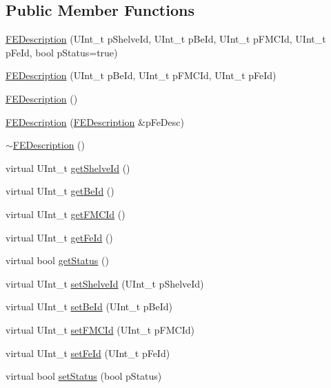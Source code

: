 \subsection*{Public Member Functions}
\begin{DoxyCompactItemize}
\item 
\hyperlink{class_ph2___hw_description_1_1_f_e_description_a8d57b56f9f6f532d16079f0d63dcc8ac}{F\-E\-Description} (U\-Int\-\_\-t p\-Shelve\-Id, U\-Int\-\_\-t p\-Be\-Id, U\-Int\-\_\-t p\-F\-M\-C\-Id, U\-Int\-\_\-t p\-Fe\-Id, bool p\-Status=true)
\item 
\hyperlink{class_ph2___hw_description_1_1_f_e_description_a2619a856a6be6afdbbdee8a2ffecabd8}{F\-E\-Description} (U\-Int\-\_\-t p\-Be\-Id, U\-Int\-\_\-t p\-F\-M\-C\-Id, U\-Int\-\_\-t p\-Fe\-Id)
\item 
\hyperlink{class_ph2___hw_description_1_1_f_e_description_abc5f53987051c0d9746c97e1d993b143}{F\-E\-Description} ()
\item 
\hyperlink{class_ph2___hw_description_1_1_f_e_description_a2c6acc6560237db018675503bd1dc17c}{F\-E\-Description} (\hyperlink{class_ph2___hw_description_1_1_f_e_description}{F\-E\-Description} \&p\-Fe\-Desc)
\item 
\hyperlink{class_ph2___hw_description_1_1_f_e_description_a6f055cd3fade537864dd7c3b34fede39}{$\sim$\-F\-E\-Description} ()
\item 
virtual U\-Int\-\_\-t \hyperlink{class_ph2___hw_description_1_1_f_e_description_a88b8c4fbcd4e0457598fc62a9ee9e738}{get\-Shelve\-Id} ()
\item 
virtual U\-Int\-\_\-t \hyperlink{class_ph2___hw_description_1_1_f_e_description_a490d84e3207965c1519291ed807f2de3}{get\-Be\-Id} ()
\item 
virtual U\-Int\-\_\-t \hyperlink{class_ph2___hw_description_1_1_f_e_description_afe75c47d779452eea1f0754fbffae6bf}{get\-F\-M\-C\-Id} ()
\item 
virtual U\-Int\-\_\-t \hyperlink{class_ph2___hw_description_1_1_f_e_description_a504aa020c9bcfcc314e6018a003622ca}{get\-Fe\-Id} ()
\item 
virtual bool \hyperlink{class_ph2___hw_description_1_1_f_e_description_a617ae77418832f97179026559685ea2d}{get\-Status} ()
\item 
virtual U\-Int\-\_\-t \hyperlink{class_ph2___hw_description_1_1_f_e_description_af658e76199a04e214cf5644d81f149bf}{set\-Shelve\-Id} (U\-Int\-\_\-t p\-Shelve\-Id)
\item 
virtual U\-Int\-\_\-t \hyperlink{class_ph2___hw_description_1_1_f_e_description_a781b5dcfc6706e84bf531be4cc3a30bc}{set\-Be\-Id} (U\-Int\-\_\-t p\-Be\-Id)
\item 
virtual U\-Int\-\_\-t \hyperlink{class_ph2___hw_description_1_1_f_e_description_aa29c45a1e7d56712b0fc4904224df8a8}{set\-F\-M\-C\-Id} (U\-Int\-\_\-t p\-F\-M\-C\-Id)
\item 
virtual U\-Int\-\_\-t \hyperlink{class_ph2___hw_description_1_1_f_e_description_a45287f64583ac4291808a5e3567f3ba4}{set\-Fe\-Id} (U\-Int\-\_\-t p\-Fe\-Id)
\item 
virtual bool \hyperlink{class_ph2___hw_description_1_1_f_e_description_aa6e842d9be9aba79eccf5691ca6f7695}{set\-Status} (bool p\-Status)
\end{DoxyCompactItemize}
